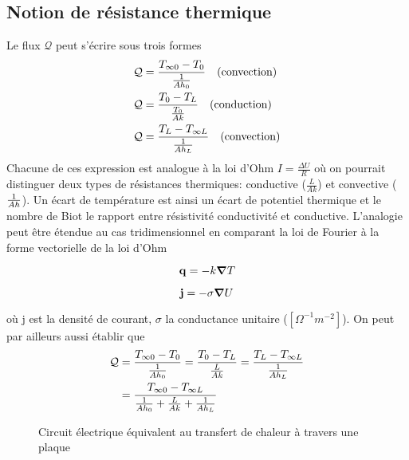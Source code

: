     \subsection{Notion de résistance thermique}
      Le flux $\mathcal{Q}$ peut s'écrire sous trois formes
      \begin{equation}
        \begin{aligned}
          \mathcal{Q} &= \frac{T_{\infty 0} - T_0}{\frac{1}{Ah_0}} \quad \textrm{(convection)}\\
          \mathcal{Q} &= \frac{T_0 - T_L}{\frac{T_0}{Ak}} \quad \textrm{(conduction)}\\
          \mathcal{Q} &= \frac{T_L - T_{\infty L}}{\frac{1}{Ah_L}} \quad \textrm{(convection)}
        \end{aligned}
      \end{equation}
      Chacune de ces expression est analogue à la loi d'Ohm $I = \frac{\Delta U}{R}$ où on pourrait distinguer deux types de résistances thermiques: conductive ($\frac{L}{Ak}$) et convective ($\frac{1}{Ah}$). Un écart de température est ainsi un écart de potentiel thermique et le nombre de Biot le rapport entre résistivité conductivité et conductive. L'analogie peut être étendue au cas tridimensionnel en comparant la loi de Fourier à la forme vectorielle de la loi d'Ohm
      \begin{multicols}{2}
        \begin{equation}
          \vb{q} = - k  \grad T \nonumber
        \end{equation}

        \begin{equation}
          \vb{j} = - \sigma \grad U
        \end{equation}
      \end{multicols}
      où j est la densité de courant, $\sigma$ la conductance unitaire ($[\si{\Omega^{-1} m^{-2}}]$). On peut par ailleurs aussi établir que
      \begin{equation}
        \begin{aligned}
          \mathcal{Q} &= \frac{T_{\infty 0} - T_0}{\frac{1}{Ah_0}} = \frac{T_{0} - T_L}{\frac{L}{Ak}} = \frac{T_L - T_{\infty L}}{\frac{1}{Ah_L}}\\
          &= \frac{T_{\infty 0} - T_{\infty L}}{\frac{1}{Ah_0} + \frac{L}{Ak} + \frac{1}{Ah_L}}
        \end{aligned}
      \end{equation}

      \begin{figure}[!h]
        \centering
        
        \caption{Circuit électrique équivalent au transfert de chaleur à travers une plaque}
        \label{fig:profilTempRes}
      \end{figure}

